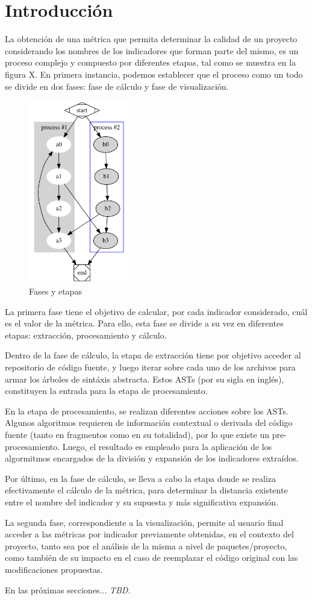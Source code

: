 \section{Introducción}

La obtención de una métrica que permita determinar la calidad de un proyecto considerando
los nombres de los indicadores que forman parte del mismo, es un proceso complejo y compuesto
por diferentes etapas, tal como se muestra en la figura X.
En primera instancia, podemos establecer que el proceso como un todo se divide en dos fases:
fase de cálculo y fase de visualización.

\begin{figure}[H]
    \includegraphics[height=8cm]{implementation/phases.png}
    \centering
    \caption{Fases y etapas}
  \end{figure}

La primera fase tiene el objetivo de calcular, por cada indicador considerado, cuál es el
valor de la métrica.
Para ello, esta fase se divide a su vez en diferentes etapas: extracción, procesamiento y
cálculo.

Dentro de la fase de cálculo, la etapa de extracción tiene por objetivo acceder al repositorio
de código fuente, y luego iterar sobre cada uno de los archivos para armar los árboles de sintáxis
abstracta.
Estos ASTs (por su sigla en inglés), constituyen la entrada para la etapa de procesamiento.

En la etapa de procesamiento, se realizan diferentes acciones sobre los ASTs.
Algunos algoritmos requieren de información contextual o derivada del código fuente (tanto en
fragmentos como en su totalidad), por lo que existe un pre-procesamiento.
Luego, el resultado es empleado para la aplicación de los algormitmos encargados de la división
y expansión de los indicadores extraídos.

Por último, en la fase de cálculo, se lleva a cabo la etapa donde se realiza efectivamente
el cálculo de la métrica, para determinar la distancia existente entre el nombre del indicador y
su supuesta y más significativa expansión.

La segunda fase, correspondiente a la visualización, permite al usuario final acceder
a las métricas por indicador previamente obtenidas, en el contexto del proyecto, tanto sea
por el análisis de la misma a nivel de paquetes/proyecto, como también de su impacto en
el caso de reemplazar el código original con las modificaciones propuestas.

En las próximas secciones... \textit{TBD}.
